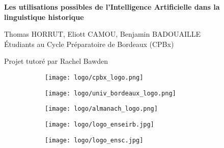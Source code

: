 \documentclass[12pt, french, twoside]{report}
\begin{document}
\begin{titlepage}
    \centering
    \vspace*{\fill}

    \huge\bfseries
    Les utilisations possibles de l'Intelligence Artificielle dans la linguistique historique
    
    \vspace*{1.5cm}
    \large Thomas HORRUT,\; Eliott CAMOU,\; Benjamin BADOUAILLE\\
    Étudiants au Cycle Préparatoire de Bordeaux (CPBx) 

    \vspace*{1.5cm}
    \large Projet tutoré par Rachel Bawden
    \vspace*{1.5cm}

    \begin{figure}[!h]
        \centering
        \begin{subfigure}[b]{0.2\textwidth}
            \texttt{[image: logo/cpbx\_logo.png]}
        \end{subfigure}\hspace{0,5cm}
        \begin{subfigure}[b]{0.5\textwidth}
            \texttt{[image: logo/univ\_bordeaux\_logo.png]}
        \end{subfigure}
        \begin{subfigure}[b]{0.2\textwidth}
            \texttt{[image: logo/almanach\_logo.png]}
        \end{subfigure}
    \end{figure}

    \begin{figure}[!h]
        \centering
        \begin{subfigure}[b]{0.4\textwidth}
            \texttt{[image: logo/logo\_enseirb.jpg]}
        \end{subfigure}\hspace{1cm}
        \begin{subfigure}[b]{0.4\textwidth}
            \texttt{[image: logo/logo\_ensc.jpg]}
        \end{subfigure}
    \end{figure}
    
    \vspace*{\fill}
\end{titlepage}

\null
\setcounter{page}{1}
\thispagestyle{empty}
\newpage %
\end{document}
